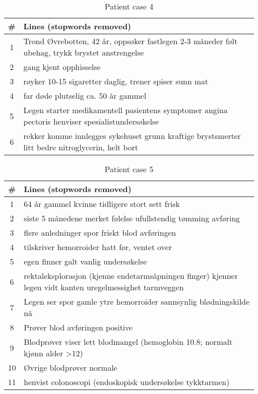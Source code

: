 \begin{table}[htbp] \footnotesize \center
\caption[]{Patient case 4\label{tab:case4}}
\begin{tabularx}{\textwidth}{c X}
    \toprule
    \# & Lines (stopwords removed) \\
    \midrule
    1 & Trond Øvrebotten, 42 år, oppsøker fastlegen 2-3 måneder følt ubehag, trykk brystet anstrengelse \\
    2 & gang kjent opphisselse \\
    3 & røyker 10-15 sigaretter daglig, trener spiser sunn mat \\
    4 & far døde plutselig ca. 50 år gammel \\
    5 & Legen starter medikamentell pasientens symptomer angina pectoris henviser spesialistundersøkelse \\
    6 & rekker komme innlegges sykehuset grunn kraftige brystsmerter litt bedre nitroglycerin, helt bort \\
    \bottomrule
\end{tabularx}
\end{table}

\begin{table}[htbp] \footnotesize \center
\caption[]{Patient case 5\label{tab:case5}}
\begin{tabularx}{\textwidth}{c X}
    \toprule
    \# & Lines (stopwords removed) \\
    \midrule
    1 & 64 år gammel kvinne tidligere stort sett frisk \\
    2 & siste 5 månedene merket følelse ufullstendig tømming avføring \\
    3 & flere anledninger spor friskt blod avføringen \\
    4 & tilskriver hemorroider hatt før, ventet over \\
    5 & egen finner galt vanlig undersøkelse \\
    6 & rektaleksplorasjon (kjenne endetarmsåpningen finger) kjenner legen vidt kanten uregelmessighet tarmveggen \\
    7 & Legen ser spor gamle ytre hemorroider sannsynlig blødningskilde nå \\
    8 & Prøver blod avføringen positive \\
    9 & Blodprøver viser lett blodmangel (hemoglobin 10.8; normalt kjønn alder >12) \\
    10 & Øvrige blodprøver normale \\
    11 & henvist colonoscopi (endoskopisk undersøkelse tykktarmen) \\
    \bottomrule
\end{tabularx}
\end{table}

